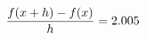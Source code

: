 \documentclass[preview]{standalone}
\begin{document}
\begin{align*}
\special{dvisvgm:raw <g id='unique000'>}\frac{f(x+h)-f(x)}{h} = 2.005\special{dvisvgm:raw </g>}
\end{align*}
\end{document}
